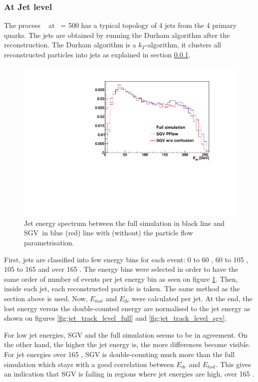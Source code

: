 \subsubsection{At Jet level}

The process \ee \ra\ \WWqqqq{} at \rts\ = 500 \GeV has a typical topology of 4 jets from the 4 primary quarks. The jets are obtained by running the Durham algorithm after the reconstruction. The Durham algorithm is a $k_T$-algorithm, it clusters all reconstructed particles into jets as explained in section \ref{}.

\begin{figure}[t]
  \centering
  \includegraphics[width=1\linewidth]{chap6/fig_SGV/Jet_spectrum.pdf}
  \caption{Jet energy spectrum between the full simulation in black line and SGV in blue (red) line with (without) the particle flow parametrisation.}
  \label{fig:jet_spectrum}
\end{figure}

First, jets are classified into few energy bins for each event: 0 to 60 \GeV, 60 to 105 \GeV, 105 to 165 \GeV and over 165 \GeV. The energy bins were selected in order to have the same order of number of events per jet energy bin as seen on figure \ref{fig:jet_spectrum}. Then, inside each jet, each reconstructed particle is taken. The same method as the section above is used. Now, $E_{lost}$ and $E_{dc}$ were calculated per jet. At the end, the lost energy versus the double-counted energy are normalised to the jet energy as shown on figures \ref{fig:jet_track_level_full} and \ref{fig:jet_track_level_sgv}.

For low jet energies, SGV and the full simulation seems to be in agreement. On the other hand, the higher the jet energy is, the more differences become visible. For jet energies over 165 \GeV, SGV is double-counting much more than the full simulation which stays with a good correlation between $E_{dc}$ and $E_{lost}$. This gives an indication that SGV is failing in regions where jet energies are high, over 165 \GeV.

